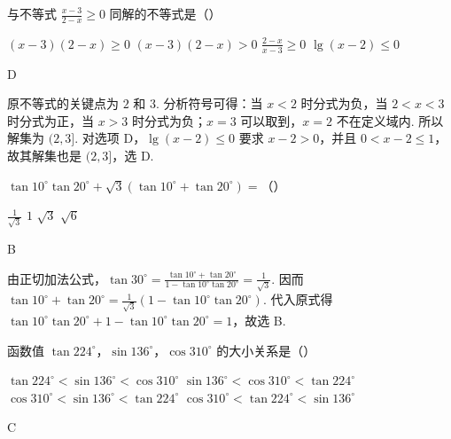 \begin{problem}
与不等式 \(\frac{x - 3}{2 - x} \geqslant 0\) 同解的不等式是（\quad）

\choices
    {\((x - 3)(2 - x) \geqslant 0\)}
    {\((x - 3)(2 - x) > 0\)}
    {\(\frac{2 - x}{x - 3} \geqslant 0\)}
    {\(\lg(x - 2) \leqslant 0\)}
\end{problem}

\begin{answer}
D
\end{answer}

\begin{solution}
原不等式的关键点为 \(2\) 和 \(3\). 分析符号可得：当 \(x<2\) 时分式为负，当 \(2<x<3\) 时分式为正，当 \(x>3\) 时分式为负；\(x=3\) 可以取到，\(x=2\) 不在定义域内. 所以解集为 \((2,3]\). 对选项 D，\(\lg(x-2)\leqslant0\) 要求 \(x-2>0\)，并且 \(0<x-2\leqslant1\)，故其解集也是 \((2,3]\)，选 D.
\end{solution}

\begin{problem}
\(\tan 10^\circ \tan 20^\circ + \sqrt{3}\left(\tan 10^\circ + \tan 20^\circ\right) =\)（\quad）

\choices
    {\(\frac{1}{\sqrt{3}}\)}
    {\(1\)}
    {\(\sqrt{3}\)}
    {\(\sqrt{6}\)}
\end{problem}

\begin{answer}
B
\end{answer}

\begin{solution}
由正切加法公式，\(\tan30^\circ=\frac{\tan10^\circ+\tan20^\circ}{1-\tan10^\circ\tan20^\circ}=\frac1{\sqrt3}\). 因而 \(\tan10^\circ+\tan20^\circ=\frac1{\sqrt3}\left(1-\tan10^\circ\tan20^\circ\right)\). 代入原式得 \(\tan10^\circ\tan20^\circ+1-\tan10^\circ\tan20^\circ=1\)，故选 B.
\end{solution}

\begin{problem}
函数值 \(\tan 224^\circ\)，\(\sin 136^\circ\)，\(\cos 310^\circ\) 的大小关系是（\quad）

\choices
    {\(\tan 224^\circ < \sin 136^\circ < \cos 310^\circ\)}
    {\(\sin 136^\circ < \cos 310^\circ < \tan 224^\circ\)}
    {\(\cos 310^\circ < \sin 136^\circ < \tan 224^\circ\)}
    {\(\cos 310^\circ < \tan 224^\circ < \sin 136^\circ\)}
\end{problem}

\begin{answer}
C
\end{answer}

